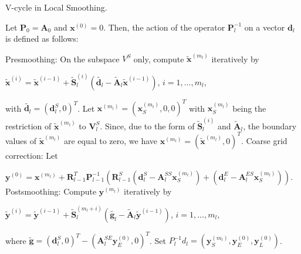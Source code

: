 \documentclass[extra, referee]{gji}
\begin{document}
\begin{algorithm}  %
    \caption{V-cycle in Local Smoothing.}  %
    \label{eq:algorithm2}
    \begin{algorithmic}[1] %
        \State Let $\mathbf{P}_0 = \mathbf{A}_0$ and $\mathbf{x}^{(0)} = 0$.
        Then, the action of the operator $\mathbf{P}_l^{-1}$ on a vector
        $\mathbf{d}_l$ is defined as follows:

        \State Presmoothing: On the subspace $V^S$ only, compute
        $\tilde{\mathbf{x}}^{(m_l)}$ iteratively by

        $\tilde{\mathbf{x}}^{(i)} = \tilde{\mathbf{x}}^{(i-1) }+
        \tilde{\mathbf{S}}^{(i)}_l\left(\tilde{\mathbf{d}_l}-\tilde{\mathbf{A}}_l\tilde{\mathbf{x}}^{(i-1)}\right)$,
        $i = 1, \ldots, m_l$,

        with $\tilde{\mathbf{d}_l} = \left(\mathbf{d}^S_l, 0\right)^T$. Let
         $\mathbf{x}^{(m_l)} = \left(\mathbf{x}^{(m_l)}_S, 0, 0\right)^T$ with
         $\mathbf{x}^{(m_l)}_S$ being the restriction of
         $\tilde{\mathbf{x}}^{(m_l)}$ to $\mathbf{V}^S_l$. Since, due to the
         form of $\tilde{\mathbf{S}}^{(i)}_l$ and $\tilde{\mathbf{A}}_l$, the
         boundary values of $\tilde{\mathbf{x}}^{(m_l)}$ are equal to zero, we
         have $\mathbf{x}^{(m_l)} = \left(\tilde{\mathbf{x}}^{(m_l)},
         0\right)^T$. \State Coarse grid correction: Let

        $\mathbf{y}^{(0)} = \mathbf{x}^{(m_l)} + \mathbf{R}^T_{l-1}
        \mathbf{P}^{-1}_{l-1}\left(\mathbf{R}^S_{l-1}(\mathbf{d}^S_l -
        \mathbf{A}^{SS}_l \mathbf{x}^{(m_l)}_S) + (\mathbf{d}^E_l -
        \mathbf{A}^{ES}_l \mathbf{x}^{(m_l)}_S) \right) $. \State Postsmoothing:
        Compute $\mathbf{y}^{(m_l)}$ iteratively by

        $\tilde{\mathbf{y}}^{(i)} = \tilde{\mathbf{y}}^{(i-1)} +
        \tilde{\mathbf{S}}^{(m_l+i)}_l \left(\tilde{\mathbf{g}_l}
        -\tilde{\mathbf{A}}_l \tilde{\mathbf{y}}^{(i-1)}\right)$, $i = 1,
        \ldots, m_l$,

        where $\tilde{\mathbf{g}} = \left(\mathbf{d}^S_l, 0\right)^T -
        \left(\mathbf{A}^{SE}_l \mathbf{y}_E^{(0)}, 0\right)^T$. \State Set
        $P^{-1}_l d_l = \left(\mathbf{y}^{(m_l)}_S, \mathbf{y}_E^{(0)},
        \mathbf{y }_L^{(0)}\right)$.

    \end{algorithmic}
\end{algorithm}
\end{document}

